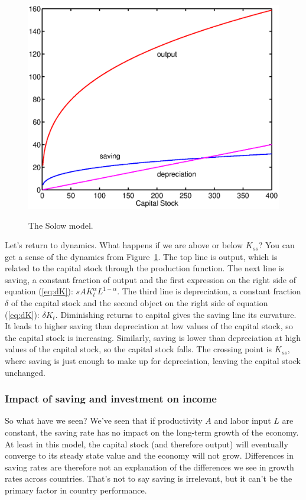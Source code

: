 \documentclass[letterpaper,12pt]{article}
\begin{document}
\begin{figure}[h]
    \centering
    \includegraphics[scale=.6]{notes_solow1.eps}\\
    \caption{The Solow model.}
    \label{fig:solow1}
\end{figure}

Let's return to dynamics.
What happens if we are above or below $K_{ss}$?
You can get a sense of the dynamics from Figure~\ref{fig:solow1}.
The top line is output,
which is related to the capital stock through the production function.
The next line is saving, a constant fraction of output
and the first expression on the right side of equation (\ref{eq:dK}):  
$s A K_t^\alpha L^{1-\alpha} $.
The third line is depreciation, a constant fraction $\delta$
of the capital stock and the second object on the right side of equation (\ref{eq:dK}):  $\delta K_t $.
Diminishing returns to capital gives the saving line its curvature.
It leads to higher saving than depreciation at low
values of the capital stock, so the capital stock is increasing.
Similarly, saving is lower than depreciation at high values of the capital stock,
so the capital stock falls.
The crossing point is $K_{ss}$, where saving is just enough to
make up for depreciation, leaving the capital stock unchanged.


\subsubsection*{Impact of saving and investment on income}

So what have we seen?
We've seen that if productivity $A$ and labor input $L$ are constant, 
the saving rate has no impact on the long-term growth of the economy.
At least in this model, the capital stock (and therefore output) will eventually 
converge to its steady state value and the economy will not grow.  
Differences in saving rates are therefore not 
an explanation of the differences we see in growth rates across countries.  
That's not to say saving is irrelevant, but it
can't be the primary factor in country performance.  
\end{document}

